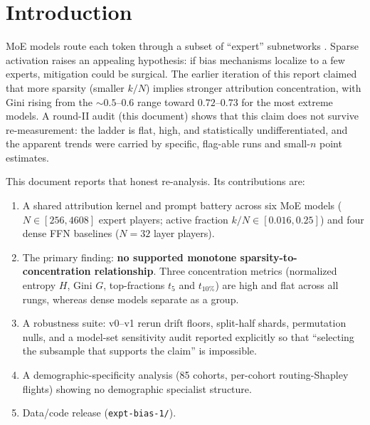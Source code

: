 \documentclass[sigconf]{acmart}
\begin{document}
\maketitle

\section{Introduction}
\label{sec:intro}
MoE models route each token through a subset of ``expert'' subnetworks
\cite{shazeer2017,fedus2022,jiang2024,cai2024}. Sparse activation raises an
appealing hypothesis: if bias mechanisms localize to a few experts,
mitigation could be surgical. The earlier iteration of this report claimed
that more sparsity (smaller $k/N$) implies stronger attribution
concentration, with Gini rising from the $\sim 0.5$--$0.6$ range toward
$0.72$--$0.73$ for the most extreme models. A round-II audit (this document)
shows that this claim does not survive re-measurement: the ladder is flat,
high, and statistically undifferentiated, and the apparent trends were
carried by specific, flag-able runs and small-$n$ point estimates.

This document reports that honest re-analysis. Its contributions are:
\begin{enumerate}
\item A shared attribution kernel and prompt battery across six MoE models
($N \in [256, 4608]$ expert players; active fraction $k/N \in [0.016, 0.25]$)
and four dense FFN baselines ($N = 32$ layer players).
\item The primary finding: \textbf{no supported monotone
sparsity-to-concentration relationship}. Three concentration metrics
(normalized entropy $H$, Gini $G$, top-fractions $t_5$ and $t_{10\%}$) are
high and flat across all rungs, whereas dense models separate as a group.
\item A robustness suite: v0--v1 rerun drift floors, split-half shards,
permutation nulls, and a model-set sensitivity audit reported explicitly so
that ``selecting the subsample that supports the claim'' is impossible.
\item A demographic-specificity analysis (85 cohorts, per-cohort
routing-Shapley flights) showing no demographic specialist structure.
\item Data/code release (\texttt{expt-bias-1/}).
\end{enumerate}
\end{document}
